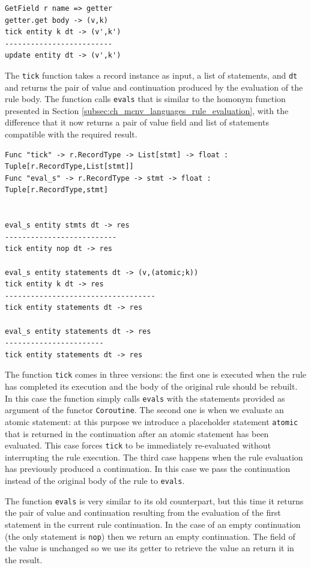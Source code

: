 \begin{lstlisting}
GetField r name => getter
getter.get body -> (v,k)
tick entity k dt -> (v',k')
-------------------------
update entity dt -> (v',k')
\end{lstlisting}

\noindent
The \texttt{tick} function takes a record instance as input, a list of statements, and \texttt{dt} and returns the pair of value and continuation produced by the evaluation of the rule body. The function calls \texttt{eval\tu s} that is similar to the homonym function presented in Section \ref{subsec:ch_mcnv_languages_rule_evaluation}, with the difference that it now returns a pair of value field and list of statements compatible with the required result.

\begin{lstlisting}
Func "tick" -> r.RecordType -> List[stmt] -> float : Tuple[r.RecordType,List[stmt]]
Func "eval_s" -> r.RecordType -> stmt -> float : Tuple[r.RecordType,stmt]


eval_s entity stmts dt -> res
--------------------------
tick entity nop dt -> res

eval_s entity statements dt -> (v,(atomic;k))
tick entity k dt -> res
-----------------------------------
tick entity statements dt -> res

eval_s entity statements dt -> res
-----------------------
tick entity statements dt -> res
\end{lstlisting}

\noindent
The function \texttt{tick} comes in three versions: the first one is executed when the rule has completed its execution and the body of the original rule should be rebuilt. In this case the function simply calls \texttt{eval\tu s} with the statements provided as argument of the functor \texttt{Coroutine}. The second one is when we evaluate an atomic statement: at this purpose we introduce a placeholder statement \texttt{atomic} that is returned in the continuation after an atomic statement has been evaluated. This case forces \texttt{tick} to be immediately re-evaluated without interrupting the rule execution. The third case happens when the rule evaluation has previously produced a continuation. In this case we pass the continuation instead of the original body of the rule to \texttt{eval\tu s}.

The function \texttt{eval\tu s} is very similar to its old counterpart, but this time it returns the pair of value and continuation resulting from the evaluation of the first statement in the current rule continuation. In the case of an empty continuation (the only statement is \texttt{nop}) then we return an empty continuation. The field of the value is unchanged so we use its getter to retrieve the value an return it in the result.

